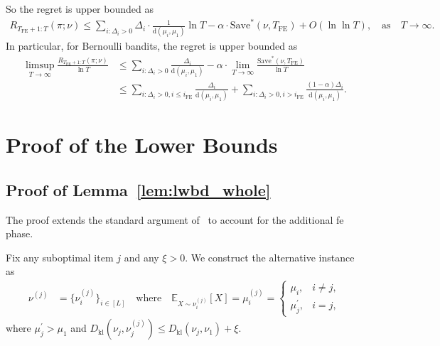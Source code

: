 \documentclass[twoside,11pt]{article}
\newcommand{\kl}{D_{\mathrm{kl}}}
\newcommand{\rmd}{\mathrm{d}}
\newcommand{\rmH}{\mathrm{H}}
\newcommand{\bbE}{\mathbb{E}}
\newcommand{\tilO}{\tilde{O}}
\newcommand{\Tfe}{T_{\mathrm{FE}}}
\newcommand{\Saved}{\mathrm{Save}}
\newcommand{\ife}{i_{\mathrm{FE}}}
\begin{document}
So the regret is upper bounded as
\begin{align}
    R_{\Tfe+1:T} (\pi;\nu )
    \leq
    \sum_{i:\Delta_i>0} \Delta_i\cdot
    \frac{1}{\rmd(\mu_i,\mu_1)} \ln T
    -
    \alpha\cdot \Saved^*(\nu,\Tfe) 
    +
    O( \ln\ln T ), \quad\mbox{as}\quad T\to\infty.
\end{align}
In particular, for Bernoulli bandits, the regret is upper bounded as
\begin{align}
    \limsup_{T\to\infty}  \frac{R_{\Tfe+1:T} (\pi;\nu )}{\ln T}
    &\leq
    \sum_{i:\Delta_i>0}\frac{\Delta_i}{\rmd(\mu_i,\mu_1)}-
    \alpha\cdot \lim_{T\to\infty}\frac{\Saved^*(\nu,\Tfe)}{\ln T}
    \\
    &\leq \sum_{i:\Delta_i>0,i\leq \ife}\frac{\Delta_i}{\rmd(\mu_i,\mu_1)}
    +
    \sum_{i:\Delta_i>0,i>\ife}\frac{(1-\alpha)\Delta_i}{\rmd(\mu_i,\mu_1)}.
\end{align}
























\section{Proof of the Lower Bounds}\label{app:lwbd_proof}
\subsection{Proof of Lemma~\ref{lem:lwbd_whole}}\label{app:lwbd_whole}
The proof extends the standard argument of~\citet[Theorem~16.2]{lattimore2020bandit} to account for the additional \ac{fe} phase.

Fix any suboptimal item $j$ and   any $\xi>0$. We construct the alternative instance as  
\begin{align}
\nu^{(j)} 
&= \bigl\{ \nu_i^{(j)} \bigr\}_{i\in[L]}
\quad\text{where}\quad
\bbE_{X\sim\nu_i^{(j)}}[X]=
\mu_i^{(j)} =
\begin{cases}
\mu_i, & i \neq j, \\
\mu_j^\prime, & i=j,
\end{cases}
\end{align}
where $\mu_j^\prime>\mu_1$ and $\kl(\nu_j,\nu_j^{(j)})\leq\kl(\nu_j,\nu_1)+\xi $.
\end{document}
